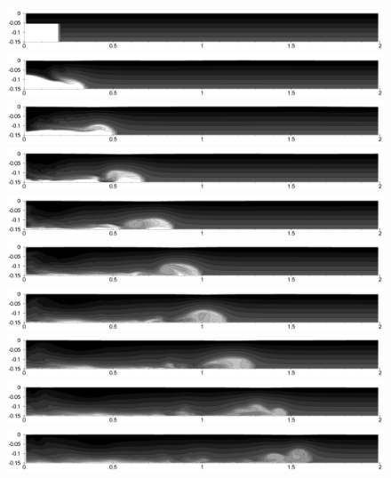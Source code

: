 \begin{figure}[htbp]
  \begin{center}    \includegraphics[scale=0.35]{../figures/Exp3-CASE1-dt0.005/rec_2_buf_24_sub_10/01.pdf}    \includegraphics[scale=0.35]{../figures/Exp3-CASE1-dt0.005/rec_2_buf_24_sub_10/03.pdf}
\includegraphics[scale=0.35]{../figures/Exp3-CASE1-dt0.005/rec_2_buf_24_sub_10/05.pdf}
\includegraphics[scale=0.35]{../figures/Exp3-CASE1-dt0.005/rec_2_buf_24_sub_10/07.pdf}    \includegraphics[scale=0.35]{../figures/Exp3-CASE1-dt0.005/rec_2_buf_24_sub_10/09.pdf}
\includegraphics[scale=0.35]{../figures/Exp3-CASE1-dt0.005/rec_2_buf_24_sub_10/11.pdf}
\includegraphics[scale=0.35]{../figures/Exp3-CASE1-dt0.005/rec_2_buf_24_sub_10/13.pdf}    \includegraphics[scale=0.35]{../figures/Exp3-CASE1-dt0.005/rec_2_buf_24_sub_10/15.pdf}
\includegraphics[scale=0.35]{../figures/Exp3-CASE1-dt0.005/rec_2_buf_24_sub_10/17.pdf}    \includegraphics[scale=0.35]{../figures/Exp3-CASE1-dt0.005/rec_2_buf_24_sub_10/19.pdf}

\end{center}
\end{figure}
